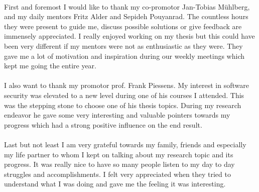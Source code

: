 \documentclass[master=cws,masteroption=vs,english]{kulemt}
\begin{document}
\begin{preface}

\paragraph*{}
First and foremost I would like to thank my co-promotor Jan-Tobias M\"uhlberg, and my daily mentors Fritz Alder and Sepideh Pouyanrad. The countless hours they were present to guide me, discuss possible solutions or give feedback are immensely appreciated. I really enjoyed working on my thesis but this could have been very different if my mentors were not as enthusiastic as they were. They gave me a lot of motivation and inspiration during our weekly meetings which kept me going the entire year.

\paragraph*{}
I also want to thank my promotor prof. Frank Piessens. My interest in software security was elevated to a new level during one of his courses I attended. This was the stepping stone to choose one of his thesis topics. During my research endeavor he gave some very interesting and valuable pointers towards my progress which had a strong positive influence on the end result.

\paragraph*{}
Last but not least I am very grateful towards my family, friends and especially my life partner to whom I kept on talking about my research topic and its progress. It was really nice to have so many people listen to my day to day struggles and accomplishments. I felt very appreciated when they tried to understand what I was doing and gave me the feeling it was interesting.
 
\end{preface}

\tableofcontents*
\end{document}
